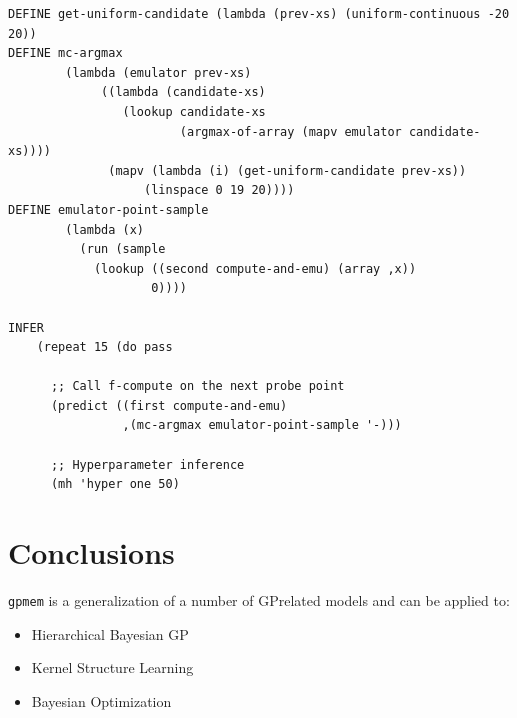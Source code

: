 \documentclass[a0,portrait]{a0poster}
\begin{document}
\begin{multicols}{2}
\begin{minipage}{38cm}
\begin{lstlisting}[frame=single,label=alg:structureVent,caption=Venture Code for Bayesian Optimization,mathescape]
DEFINE get-uniform-candidate (lambda (prev-xs) (uniform-continuous -20 20))
DEFINE mc-argmax
        (lambda (emulator prev-xs)
             ((lambda (candidate-xs)
                (lookup candidate-xs
                        (argmax-of-array (mapv emulator candidate-xs))))
              (mapv (lambda (i) (get-uniform-candidate prev-xs))
                   (linspace 0 19 20))))
DEFINE emulator-point-sample
        (lambda (x)
          (run (sample
            (lookup ((second compute-and-emu) (array ,x))
                    0))))

INFER
    (repeat 15 (do pass

      ;; Call f-compute on the next probe point
      (predict ((first compute-and-emu)
                ,(mc-argmax emulator-point-sample '-)))
                
      ;; Hyperparameter inference
      (mh 'hyper one 50)
\end{lstlisting}
\end{minipage}
      
     
     
%

   



\section*{Conclusions}
{\tt gpmem} is a generalization of a number of GP\newline related models and can be applied to:
\begin{itemize}
\setlength{\itemindent}{1cm}
\item Hierarchical Bayesian GP
\item Kernel Structure Learning
\item Bayesian Optimization
\end{itemize}

\color{DarkSlateGray} %




\end{multicols}
\end{document}
